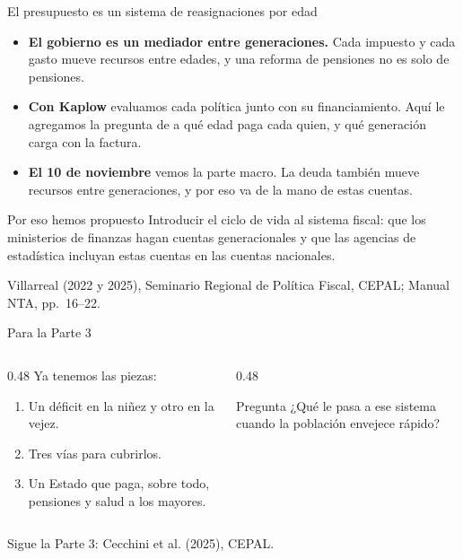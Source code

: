 \documentclass[aspectratio=169,11pt]{beamer}
\newcommand{\fuente}[1]{\par\vfill{\small\color{cGris}#1\par}}
\begin{document}
\begin{frame}{El presupuesto es un sistema de reasignaciones por edad}
  \begin{itemize}
    \item \textbf{El gobierno es un mediador entre generaciones.} Cada impuesto y cada gasto mueve recursos entre edades, y una reforma de pensiones no es solo de pensiones.
    \pause
    \item \textbf{Con Kaplow} evaluamos cada política junto con su financiamiento. Aquí le agregamos la pregunta de a qué edad paga cada quien, y qué generación carga con la factura.
    \pause
    \item \textbf{El 10 de noviembre} vemos la parte macro. La deuda también mueve recursos entre generaciones, y por eso va de la mano de estas cuentas.
  \end{itemize}
  \pause
  \begin{block}{Por eso hemos propuesto}
    Introducir el ciclo de vida al sistema fiscal: que los ministerios de finanzas hagan cuentas generacionales y que las agencias de estadística incluyan estas cuentas en las cuentas nacionales.
  \end{block}
  \fuente{Villarreal (2022 y 2025), Seminario Regional de Política Fiscal, CEPAL; Manual NTA, pp.~16--22.}
\end{frame}

\begin{frame}{Para la Parte 3}
  \begin{columns}[T]
    \begin{column}{0.48\textwidth}
      Ya tenemos las piezas:
      \begin{enumerate}
        \item Un déficit en la niñez y otro en la vejez.
        \item Tres vías para cubrirlos.
        \item Un Estado que paga, sobre todo, pensiones y salud a los mayores.
      \end{enumerate}
    \end{column}
    \begin{column}{0.48\textwidth}
      \pause
      \begin{alertblock}{Pregunta}
        ¿Qué le pasa a ese sistema cuando la población envejece rápido?
      \end{alertblock}
    \end{column}
  \end{columns}
  \fuente{Sigue la Parte 3: Cecchini et al. (2025), CEPAL.}
\end{frame}
\end{document}
